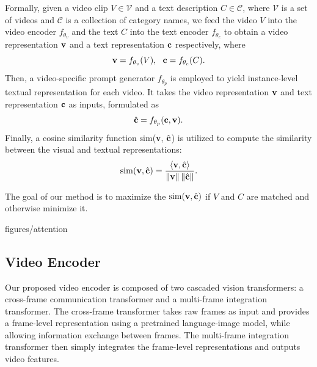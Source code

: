 \documentclass[runningheads]{llncs}
\begin{document}
Formally, given a video clip $V \in \mathcal{V}$ and a text description $C \in \mathcal{C}$, where $\mathcal{V}$ is a set of videos and $\mathcal{C}$ is a collection of category names, we feed the video $V$ into the video encoder $f_{\theta_v}$ and the text $C$ into the text encoder $f_{\theta_c}$ to obtain a video representation ${\bf{v}}$ and a text representation ${\bf{c}}$ respectively, where 
\begin{equation}
{\bf{v}} = f_{\theta_v}(V), \ \  {\bf{c}} = f_{\theta_c}(C).
\end{equation}
Then, a video-specific prompt generator $f_{\theta_p}$ is employed to yield instance-level textual representation for each video. It takes the video representation ${\bf{v}}$ and text representation ${\bf{c}}$ as inputs, formulated as 
\begin{equation}
{\hat{\bf{c}}} = f_{\theta_p}(\bf{c}, \bf{v}).\vspace{-.15cm}
\end{equation}
Finally, a cosine similarity function {$\mathrm{sim}$}({\bf{v}}, {$\hat{\bf{c}}$}) is utilized to compute the similarity between the visual and textual representations:
\begin{equation}
    {\rm sim}({\bf{v}},\hat{\bf{c}}) = \frac{\langle {\bf{v}}, \hat{\bf{c}}\rangle}{\left\|{\bf{v}}\right\| \left\|\hat{\bf{c}}\right\|}.\vspace{-.15cm}
\label{eq:cosine_similarity}
\end{equation}

\noindent The goal of our method is to maximize the ${\rm sim}({\bf{v}}, \hat{\bf{c}})$ if $V$ and $C$ are matched and otherwise minimize it. 

{figures/attention}
\subsection{Video Encoder}\label{sec:encoder}

Our proposed video encoder is composed of two cascaded vision transformers: a cross-frame communication transformer and a multi-frame integration transformer. The cross-frame transformer takes raw frames as input and provides a frame-level representation using a pretrained language-image model, while allowing information exchange between frames. The multi-frame integration transformer then simply integrates the frame-level representations and outputs video features.
\end{document}
